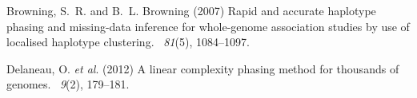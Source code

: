 \documentclass{article}
\newcounter{todocounter}
\newcommand{\done}[2][]
{\todo[color=green!40, #1]{#2}}
\newcommand{\donenum}[2][]
{\stepcounter{todocounter}\done[#1]{\thetodocounter: #2}}
\begin{document}
\begin{thebibliography}{}



Browning, S.~R. and B.~L. Browning (2007)
\newblock Rapid and accurate haplotype phasing and missing-data inference for
  whole-genome association studies by use of localised haplotype clustering.
~{\em 81\/}(5), 1084--1097.



Delaneau, O. {\em et al}. (2012)
\newblock A linear complexity phasing method for thousands of genomes.
~{\em 9\/}(2), 179--181.



\end{thebibliography}
\end{document}
